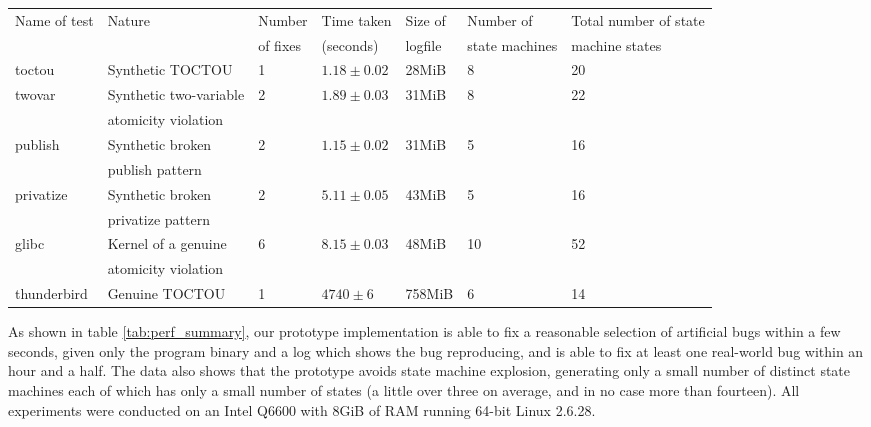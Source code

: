 \documentclass[10pt,twocolumn,preprint,natbib,authoryear]{sigplanconf}
\begin{document}
\begin{table*}
\begin{tabular}{lllllll}
Name of test & Nature & Number & Time taken & Size of & Number of &
Total number of state\\ & & of fixes & (seconds) & logfile & state
machines & machine states\\ \hline toctou & Synthetic TOCTOU & 1 &
$1.18 \pm 0.02$ & 28MiB & 8 & 20\\
twovar & Synthetic two-variable & 2 & $1.89 \pm 0.03$ & 31MiB & 8 & 22\\
       & atomicity violation &&&\\
publish & Synthetic broken & 2 & $1.15 \pm 0.02$ & 31MiB & 5 & 16 \\
        & publish pattern & & & \\
privatize & Synthetic broken & 2 & $5.11 \pm 0.05$ & 43MiB & 5 & 16 \\
          & privatize pattern & & & \\
\hline
glibc & Kernel of a genuine & 6 & $8.15 \pm 0.03$ & 48MiB & 10 & 52\\
      & atomicity violation & & & \\
\hline
thunderbird & Genuine TOCTOU & 1 & $4740 \pm 6$ & 758MiB & 6 & 14
\end{tabular}
\caption{Summary of results obtained from running the fix generating
  tool on a single log file collected from each bug.  The ``Time taken''
  column gives the mean and standard deviation from five runs.}
\label{tab:perf_summary}
\end{table*}

As shown in table \ref{tab:perf_summary}, our prototype implementation
is able to fix a reasonable selection of artificial bugs within a few
seconds, given only the program binary and a log which shows the bug
reproducing, and is able to fix at least one real-world bug within an
hour and a half.  The data also shows that the prototype avoids state
machine explosion, generating only a small number of distinct state
machines each of which has only a small number of states (a little
over three on average, and in no case more than fourteen).  All
experiments were conducted on an Intel Q6600 with 8GiB of RAM running
64-bit Linux 2.6.28.

\begin{figure*}
\hspace{10mm} 
\caption{Breakdown of time spent in various phases of the analysis
  process.  Results presented are mean and standard deviation of five
  runs of the fix-generating program applied to a single log file for
  each bug.}
\end{figure*}
\end{document}
